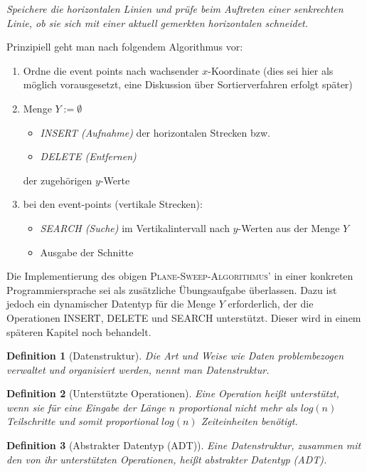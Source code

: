 \documentclass[ngerman]{scrreprt}%
\theoremstyle{break}
\newtheorem{definition}{Definition}
\begin{document}
\textit{Speichere die horizontalen Linien und prüfe beim Auftreten einer
senkrechten Linie, ob sie sich mit einer aktuell gemerkten horizontalen
schneidet.}

Prinzipiell geht man nach folgendem Algorithmus vor:
\begin{enumerate}
 \item Ordne die event points nach wachsender $x$-Koordinate (dies sei hier
  als möglich vorausgesetzt, eine Diskussion über Sortierverfahren erfolgt
  später)
 \item Menge $Y := \emptyset$  
  \begin{itemize}
   \item \textit{INSERT (Aufnahme)} der horizontalen Strecken bzw.
   \item \textit{DELETE (Entfernen)}
  \end{itemize}
  der zugehörigen $y$-Werte
 \item bei den event-points (vertikale Strecken):
  \begin{itemize}
   \item \textit{SEARCH (Suche)} im Vertikalintervall nach $y$-Werten aus der 
    Menge $Y$
   \item Ausgabe der Schnitte
  \end{itemize}
\end{enumerate}

Die Implementierung des obigen
\textsc{Plane-Sweep-Algorithmus'} in einer konkreten Programmiersprache
sei als zusätzliche Übungsaufgabe überlassen. Dazu ist jedoch ein dynamischer
Datentyp für die Menge $Y$ erforderlich, der die Operationen INSERT,
DELETE und SEARCH unterstützt. Dieser wird in einem späteren Kapitel noch behandelt. 

\begin{definition}[Datenstruktur]
  Die Art und Weise wie Daten problembezogen verwaltet und organisiert
  werden, nennt man Datenstruktur.
\end{definition}

\label{ADT}
\begin{definition}[Unterstützte Operationen]
  Eine Operation heißt unterstützt, wenn sie für eine Eingabe
  der Länge $n$ proportional nicht mehr als $log(n)$ Teilschritte und
  somit proportional $log(n)$ Zeiteinheiten benötigt.
\end{definition}

\begin{definition}[Abstrakter Datentyp (ADT)]
  Eine Datenstruktur, zusammen mit den von ihr unterstützten Operationen, 
  heißt abstrakter Datentyp (ADT).
\end{definition}
\end{document}
